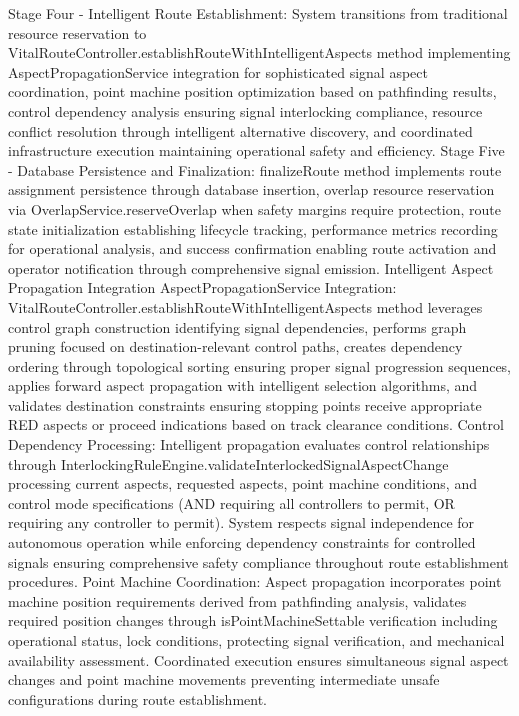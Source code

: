 Stage Four - Intelligent Route Establishment: System transitions from traditional resource reservation to VitalRouteController.establishRouteWithIntelligentAspects method implementing AspectPropagationService integration for sophisticated signal aspect coordination, point machine position optimization based on pathfinding results, control dependency analysis ensuring signal interlocking compliance, resource conflict resolution through intelligent alternative discovery, and coordinated infrastructure execution maintaining operational safety and efficiency.
Stage Five - Database Persistence and Finalization: finalizeRoute method implements route assignment persistence through database insertion, overlap resource reservation via OverlapService.reserveOverlap when safety margins require protection, route state initialization establishing lifecycle tracking, performance metrics recording for operational analysis, and success confirmation enabling route activation and operator notification through comprehensive signal emission.
Intelligent Aspect Propagation Integration
AspectPropagationService Integration: VitalRouteController.establishRouteWithIntelligentAspects method leverages control graph construction identifying signal dependencies, performs graph pruning focused on destination-relevant control paths, creates dependency ordering through topological sorting ensuring proper signal progression sequences, applies forward aspect propagation with intelligent selection algorithms, and validates destination constraints ensuring stopping points receive appropriate RED aspects or proceed indications based on track clearance conditions.
Control Dependency Processing: Intelligent propagation evaluates control relationships through InterlockingRuleEngine.validateInterlockedSignalAspectChange processing current aspects, requested aspects, point machine conditions, and control mode specifications (AND requiring all controllers to permit, OR requiring any controller to permit). System respects signal independence for autonomous operation while enforcing dependency constraints for controlled signals ensuring comprehensive safety compliance throughout route establishment procedures.
Point Machine Coordination: Aspect propagation incorporates point machine position requirements derived from pathfinding analysis, validates required position changes through isPointMachineSettable verification including operational status, lock conditions, protecting signal verification, and mechanical availability assessment. Coordinated execution ensures simultaneous signal aspect changes and point machine movements preventing intermediate unsafe configurations during route establishment.
